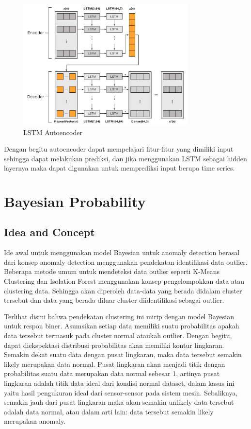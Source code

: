 \begin{figure}[h]
    \centering
    \includegraphics[width=0.8\textwidth]{resources/lstm_ae.png}
    \caption{LSTM Autoencoder}
\end{figure}

Dengan begitu autoencoder dapat mempelajari fitur-fitur yang dimiliki input sehingga dapat melakukan prediksi, dan jika menggunakan LSTM sebagai hidden layernya maka dapat digunakan untuk memprediksi input berupa time series.

\section{Bayesian Probability}
\subsection{Idea and Concept}

Ide awal untuk menggunakan model Bayesian untuk anomaly detection berasal dari konsep anomaly detection menggunakan pendekatan identifikasi data outlier. Beberapa metode umum untuk mendeteksi data outlier seperti K-Means Clustering dan Isolation Forest menggunakan konsep pengelompokkan data atau clustering data. Sehingga akan diperoleh data-data yang berada didalam cluster tersebut dan data yang berada diluar cluster diidentifikasi sebagai outlier.

Terlihat disini bahwa pendekatan clustering ini mirip dengan model Bayesian untuk respon biner. Asumsikan setiap data memiliki suatu probabilitas apakah data tersebut termasuk pada cluster normal ataukah outlier. Dengan begitu, dapat diekspektasi distribusi probabilitas akan memiliki kontur lingkaran. Semakin dekat suatu data dengan pusat lingkaran, maka data tersebut semakin likely merupakan data normal. Pusat lingkaran akan menjadi titik dengan probabilitas suatu data merupakan data normal sebesar 1, artinya pusat lingkaran adalah titik data ideal dari kondisi normal dataset, dalam kasus ini yaitu hasil pengukuran ideal dari sensor-sensor pada sistem mesin. Sebaliknya, semakin jauh dari pusat lingkaran maka akan semakin unlikely data tersebut adalah data normal, atau dalam arti lain: data tersebut semakin likely merupakan anomaly.

